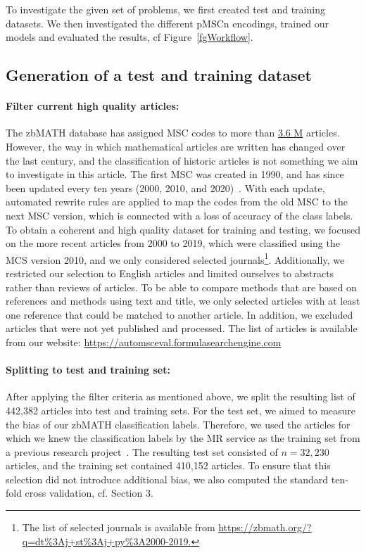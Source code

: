 To investigate the given set of problems, we first created test and training datasets.
We then investigated the different pMSCn encodings, trained our models and evaluated the results, cf Figure~\ref{fgWorkflow}.

\subsection{Generation of a test and training dataset}
\paragraph{Filter current high quality articles:}
The zbMATH database has assigned MSC codes to more than \href{https://zbmath.org/?q=cc\%3A*}{3.6 M} articles.
However, the way in which mathematical articles are written has changed over the last century, and the classification of historic articles is not something we aim to investigate in this article.
The first MSC was created in 1990, and has since been updated every ten years (2000, 2010, and 2020)~\cite{MSC2010}.
With each update, automated rewrite rules are applied to map the codes from the old MSC to the next MSC version, which is connected with a loss of accuracy of the class labels.
To obtain a coherent and high quality dataset for training and testing, we focused on the more recent articles from 2000 to 2019, which were classified using the MCS version 2010, and we only considered selected journals\footnote{The list of selected journals is available from \url{https://zbmath.org/?q=dt\%3Aj+st\%3Aj+py\%3A2000-2019.}}.
Additionally, we restricted our selection to English articles and limited ourselves to abstracts rather than reviews of articles.
To be able to compare methods that are based on references and methods using text and title, we only selected articles with at least one reference that could be matched to another article.
In addition, we excluded articles that were not yet published and processed.
The list of articles is available from our website: \url{https://automsceval.formulasearchengine.com}
\paragraph{Splitting to test and training set:}
After applying the filter criteria as mentioned above, we split the resulting list of 442,382 articles into test and training sets.
For the test set, we aimed to measure the bias of our zbMATH classification labels.
Therefore, we used the articles for which we knew the classification labels by the MR service as the training set from a previous research project~\cite{Bannister2018}.
The resulting test set consisted of \(n = 32,230\) articles, and the training set contained 410,152 articles.
To ensure that this selection did not introduce additional bias, we also computed the standard ten-fold cross validation, cf. Section 3.
